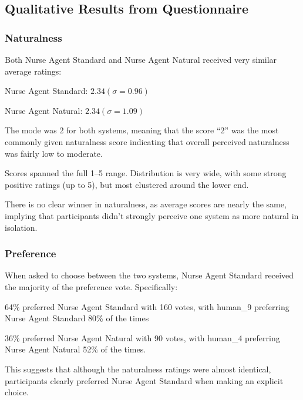 \clearpage


\subsection{Qualitative Results from Questionnaire}
\subsubsection{Naturalness}
Both Nurse Agent Standard and Nurse Agent Natural received very similar average ratings:

Nurse Agent Standard: $2.34  (\sigma = 0.96)$

Nurse Agent Natural: $2.34  (\sigma = 1.09)$

The mode was 2 for both systems, meaning that the score “2” was the most commonly given naturalness score indicating that overall perceived naturalness was fairly low to moderate.

Scores spanned the full 1–5 range. Distribution is very wide, with some strong positive ratings (up to 5), but most clustered around the lower end.

There is no clear winner in naturalness, as average scores are nearly the same, implying that participants didn’t strongly perceive one system as more natural in isolation.

\subsubsection{Preference}
When asked to choose between the two systems, Nurse Agent Standard received the majority of the preference vote. Specifically:

64\% preferred Nurse Agent Standard with 160 votes, with human\_9 preferring Nurse Agent Standard 80\% of the times

36\% preferred Nurse Agent Natural with 90 votes, with human\_4 preferring Nurse Agent Natural 52\% of the times. 

This suggests that although the naturalness ratings were almost identical, participants clearly preferred Nurse Agent Standard when making an explicit choice.


